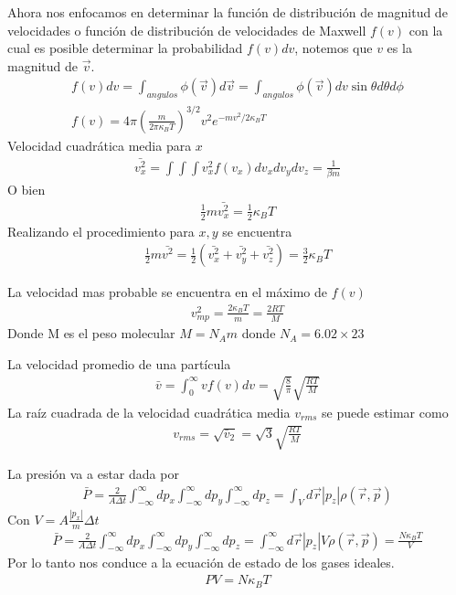\documentclass{article}
\begin{document}
Ahora nos enfocamos en determinar la función de distribución de magnitud de velocidades o función de distribución de velocidades de Maxwell $ f\left(v\right) $ con la cual es posible determinar la probabilidad $ f\left(v\right)dv  $, notemos que $ v  $ es la magnitud de $ \vec v  $.
\begin{gather*}
  f\left(v\right) dv = \displaystyle\int_{angulos }^{} \phi \left(\vec v \right)d\vec v = \displaystyle\int_{angulos }^{}\phi \left(\vec v \right) dv \sin{\theta}d\theta d\phi \\
  f\left(v\right) = 4\pi \left(\frac{m }{2\pi \kappa_B T }\right)^ {3/2 } v^2 e ^ {-m v^2 / 2 \kappa_B T }
\end{gather*}
Velocidad cuadrática media para $ x  $ 
\begin{gather*}
  \bar{v_x^2 } = \int\int\int v_x^2 f\left(v_x\right)dv_xdv_ydv_z = \frac{1}{\beta m }
\end{gather*}
O bien 
\begin{gather*}
  \frac{1}{2} m \bar{v_x^2 } = \frac{1}{2} \kappa_B T 
\end{gather*}
Realizando el procedimiento para $ x,y  $ se encuentra 
\begin{gather*}
  \frac{1}{2}m \bar{v^2 } = \frac{1}{2}(\bar{v_x^2 } + \bar{v_y^2 } + \bar{v_z^2 }) = \frac{3 }{2} \kappa_B T 
\end{gather*}

La velocidad mas probable se encuentra en el máximo de $ f(v)  $ 
\begin{gather*}
  v_{mp}^2 = \frac{2\kappa_B T }{m } = \frac{2RT }{M }
\end{gather*}
Donde M es el peso molecular $ M = N_A m  $ donde $ N_A = 6.02 \times 23  $

La velocidad promedio de una partícula 
\begin{gather}
  \bar v = \int_{0 }^{\infty} v f\left(v\right)dv = \sqrt{\frac{8}{\pi }} \sqrt{\frac{RT }{M }} 
\end{gather}
La raíz cuadrada de la velocidad cuadrática media $ v _{rms }  $ se puede estimar como 
\begin{gather*}
  v _{rms } = \sqrt{\bar v_2 } = \sqrt{3 } \sqrt{\frac{RT }{M }}  
\end{gather*}

La presión va a estar dada por 
\begin{gather*}
  \bar P = \frac{2 }{A\Delta t } \displaystyle\int_{-\infty}^{\infty} dp_x \displaystyle\int_{-\infty}^{\infty} dp_y \displaystyle\int_{-\infty}^{\infty} dp_z = \displaystyle\int_{V }^{} d\vec r \left|p_z \right| \rho(\vec r, \vec p ) 
\end{gather*}
Con $ V = A \frac{\left|p_x \right|}{m }\Delta t  $ 
\begin{gather*}
  \bar P = \frac{2 }{A\Delta t } \displaystyle\int_{-\infty}^{\infty} dp_x \displaystyle\int_{-\infty}^{\infty} dp_y \displaystyle\int_{-\infty}^{\infty} dp_z = \displaystyle\int_{-\infty  }^{\infty} d\vec r \left|p_z \right| V \rho(\vec r, \vec p ) = \frac{N\kappa_B T }{V }
\end{gather*}
Por lo tanto nos conduce a la ecuación de estado de los gases ideales.
\begin{gather*}
  PV = N \kappa_B T  
\end{gather*}
\end{document}
